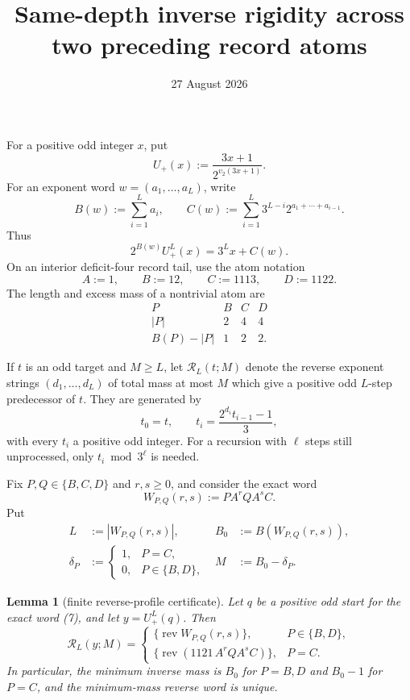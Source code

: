 \documentclass[11pt]{article}
\title{Same-depth inverse rigidity across two preceding record atoms}
\author{}
\date{27 August 2026}
\newtheorem{lemma}[theorem]{Lemma}
\newcommand{\Up}{U_+}
\newcommand{\rev}{\operatorname{rev}}
\begin{document}
\maketitle

For a positive odd integer $x$, put
\[
 \Up(x):=\frac{3x+1}{2^{v_2(3x+1)}}.
 \tag{1}
\]
For an exponent word $w=(a_1,\ldots,a_L)$, write
\[
 B(w):=\sum_{i=1}^L a_i,
 \qquad
 C(w):=\sum_{i=1}^L3^{L-i}2^{a_1+\cdots+a_{i-1}}.
 \tag{2}
\]
Thus
\[
 2^{B(w)}\Up^L(x)=3^Lx+C(w).
 \tag{3}
\]
On an interior deficit-four record tail, use the atom notation
\[
 A:=1,\qquad B:=12,\qquad C:=1113,\qquad D:=1122.
 \tag{4}
\]
The length and excess mass of a nontrivial atom are
\[
 \begin{array}{c|ccc}
 P&B&C&D\\ \hline
 |P|&2&4&4\\
 B(P)-|P|&1&2&2.
 \end{array}
 \tag{5}
\]

If $t$ is an odd target and $M\geq L$, let $\mathcal R_L(t;M)$
denote the reverse exponent strings $(d_1,\ldots,d_L)$ of total mass at
most $M$ which give a positive odd $L$-step predecessor of $t$.  They are
generated by
\[
 t_0=t,
 \qquad
 t_i=\frac{2^{d_i}t_{i-1}-1}{3},
 \tag{6}
\]
with every $t_i$ a positive odd integer.  For a recursion with $\ell$
steps still unprocessed, only $t_i\bmod 3^\ell$ is needed.

Fix $P,Q\in\{B,C,D\}$ and $r,s\geq0$, and consider the exact word
\[
 W_{P,Q}(r,s):=P A^r Q A^s C.
 \tag{7}
\]
Put
\[
 \begin{aligned}
 L&:=|W_{P,Q}(r,s)|,
 &B_0&:=B(W_{P,Q}(r,s)),\\
 \delta_P&:=\begin{cases}1,&P=C,\\0,&P\in\{B,D\},\end{cases}
 &M&:=B_0-\delta_P.
 \end{aligned}
 \tag{8}
\]

\begin{lemma}[finite reverse-profile certificate]
Let $q$ be a positive odd start for the exact word (7), and let
$y=\Up^L(q)$.  Then
\[
 \boxed{
 \mathcal R_L(y;M)=
 \begin{cases}
  \{\rev W_{P,Q}(r,s)\},&P\in\{B,D\},\\[2mm]
  \{\rev(1121\,A^rQ A^sC)\},&P=C.
 \end{cases}}
 \tag{9}
\]
In particular, the minimum inverse mass is $B_0$ for $P=B,D$ and
$B_0-1$ for $P=C$, and the minimum-mass reverse word is unique.
\end{lemma}
\end{document}
